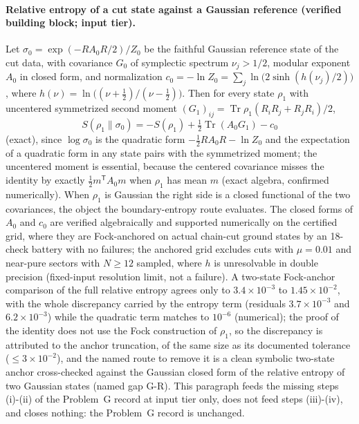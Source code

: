 \paragraph{Relative entropy of a cut state against a Gaussian reference (verified building block; input tier).}
Let \(\sigma_0=\exp(-R A_0 R/2)/Z_0\) be the faithful Gaussian reference state of the cut data, with covariance \(G_0\) of symplectic spectrum \(\nu_j>1/2\), modular exponent \(A_0\) in closed form, and normalization \(c_0=-\ln Z_0=\sum_j\ln\bigl(2\sinh(h(\nu_j)/2)\bigr)\), where \(h(\nu)=\ln\bigl((\nu+\tfrac12)/(\nu-\tfrac12)\bigr)\). Then for every state \(\rho_1\) with uncentered symmetrized second moment \((G_1)_{ij}=\operatorname{Tr}\rho_1(R_iR_j+R_jR_i)/2\),
\[
S(\rho_1\|\sigma_0)=-S(\rho_1)+\tfrac12\operatorname{Tr}(A_0G_1)-c_0
\]
(exact), since \(\log\sigma_0\) is the quadratic form \(-\tfrac12 R A_0 R-\ln Z_0\) and the expectation of a quadratic form in any state pairs with the symmetrized moment; the uncentered moment is essential, because the centered covariance misses the identity by exactly \(\tfrac12 m^{\mathsf T}A_0 m\) when \(\rho_1\) has mean \(m\) (exact algebra, confirmed numerically). When \(\rho_1\) is Gaussian the right side is a closed functional of the two covariances, the object the boundary-entropy route evaluates. The closed forms of \(A_0\) and \(c_0\) are verified algebraically and supported numerically on the certified grid, where they are Fock-anchored on actual chain-cut ground states by an 18-check battery with no failures; the anchored grid excludes cuts with \(\mu=0.01\) and near-pure sectors with \(N\ge12\) sampled, where \(h\) is unresolvable in double precision (fixed-input resolution limit, not a failure). A two-state Fock-anchor comparison of the full relative entropy agrees only to \(3.4\times10^{-3}\) to \(1.45\times10^{-2}\), with the whole discrepancy carried by the entropy term (residuals \(3.7\times10^{-3}\) and \(6.2\times10^{-3}\)) while the quadratic term matches to \(10^{-6}\) (numerical); the proof of the identity does not use the Fock construction of \(\rho_1\), so the discrepancy is attributed to the anchor truncation, of the same size as its documented tolerance (\(\le3\times10^{-2}\)), and the named route to remove it is a clean symbolic two-state anchor cross-checked against the Gaussian closed form of the relative entropy of two Gaussian states (named gap G-R). This paragraph feeds the missing steps (i)-(ii) of the Problem~G record at input tier only, does not feed steps (iii)-(iv), and closes nothing: the Problem~G record is unchanged.


